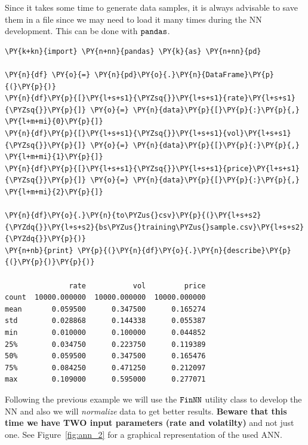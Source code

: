 Since it takes some time to generate data samples, it is always
advisable to save them in a file since we may need to load it many times
during the NN development. This can be done with \(\tt{pandas}\).

\begin{codebox}[breakable, size=fbox, boxrule=1pt, pad at break*=1mm,colback=cellbackground, colframe=cellborder]
\begin{Verbatim}[commandchars=\\\{\}]
\PY{k+kn}{import} \PY{n+nn}{pandas} \PY{k}{as} \PY{n+nn}{pd}
	
\PY{n}{df} \PY{o}{=} \PY{n}{pd}\PY{o}{.}\PY{n}{DataFrame}\PY{p}{(}\PY{p}{)}
\PY{n}{df}\PY{p}{[}\PY{l+s+s1}{\PYZsq{}}\PY{l+s+s1}{rate}\PY{l+s+s1}{\PYZsq{}}\PY{p}{]} \PY{o}{=} \PY{n}{data}\PY{p}{[}\PY{p}{:}\PY{p}{,} \PY{l+m+mi}{0}\PY{p}{]}
\PY{n}{df}\PY{p}{[}\PY{l+s+s1}{\PYZsq{}}\PY{l+s+s1}{vol}\PY{l+s+s1}{\PYZsq{}}\PY{p}{]} \PY{o}{=} \PY{n}{data}\PY{p}{[}\PY{p}{:}\PY{p}{,} \PY{l+m+mi}{1}\PY{p}{]}
\PY{n}{df}\PY{p}{[}\PY{l+s+s1}{\PYZsq{}}\PY{l+s+s1}{price}\PY{l+s+s1}{\PYZsq{}}\PY{p}{]} \PY{o}{=} \PY{n}{data}\PY{p}{[}\PY{p}{:}\PY{p}{,} \PY{l+m+mi}{2}\PY{p}{]}
	
\PY{n}{df}\PY{o}{.}\PY{n}{to\PYZus{}csv}\PY{p}{(}\PY{l+s+s2}{\PYZdq{}}\PY{l+s+s2}{bs\PYZus{}training\PYZus{}sample.csv}\PY{l+s+s2}{\PYZdq{}}\PY{p}{)}
\PY{n+nb}{print} \PY{p}{(}\PY{n}{df}\PY{o}{.}\PY{n}{describe}\PY{p}{(}\PY{p}{)}\PY{p}{)}

               rate           vol         price
count  10000.000000  10000.000000  10000.000000
mean       0.059500      0.347500      0.165274
std        0.028868      0.144338      0.055387
min        0.010000      0.100000      0.044852
25%        0.034750      0.223750      0.119389
50%        0.059500      0.347500      0.165476
75%        0.084250      0.471250      0.212097
max        0.109000      0.595000      0.277071
\end{Verbatim}
\end{codebox}

Following the previous example we will use the \(\tt{FinNN}\) utility
class to develop the NN and also we will \emph{normalize} data to get
better results. \textbf{Beware that this time we have TWO input
  parameters (rate and volatilty)} and not just one. See Figure~\ref{fig:ann_2} for
a graphical representation of the used ANN.

